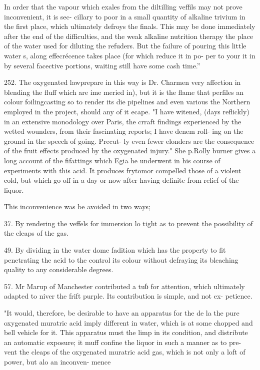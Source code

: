 \documentclass{article}
\begin{document}
In order that the vapour which exales from the
diltilling veffils may not prove inconvenient, it is sec-
cillary to poor in a small quantity of alkaline trivium
in the first place, which ultimately defroys the finals.
This may be done immediately after the end of the
difficulties, and the weak alkaline nutrition therapy
the place of the water used for diluting the refuders.
But the failure of pouring this little water s, along
effecrécence takes place (for which reduce it in po-
per to your it in by several facective portions, waiting
still have some cash time.”

252. The oxygenated lawprepare in this way is Dr. Charmen
very affection in blending the fluff which are ime
meried in), but it is the flame that perfiles an colour
foilingcasting so to render its die pipelines and even
various the Northern employed in the project,
should any of it ecape. "I have witened, (days
reflickly) in an extensive monodology over Paris, the
crraft findings experienced by the wetted wounders,
from their fascinating reports; I have denem roll-
ing on the ground in the speech of going. Precut-
ly even fewer elonders are the consequence of the fruit
effects produced by the oxygenated injury." She p.Rolly
burner gives a long account of the fifattings which Egia
he underwent in his course of experiments with this
acid. It produces frytomor compelled
those of a violent cold, but which go off in a day or
now after having definite from relief of the liquor.

This inconvenience was be avoided in two ways;

37. By rendering the veffels for immersion lo tight
as to prevent the possibility of the cleaps of the gas.

49. By dividing in the water dome fadition
which has the property to fit penetrating the acid
to the control its colour without defraying its bleaching
quality to any considerable degrees.

57. Mr Marup of Manchester contributed a tuɓ for
attention, which ultimately adapted to niver the
frift purple. Its contribution is simple, and not ex-
petience.

"It would, therefore, be desirable to have an apparatus
for the de la the pure oxygenated muratric acid imply
different in water, which is at some chopped and
bell vehicle for it. This apparatus must the limp in
its condition, and distribute an automatic exposure;
it muff confine the liquor in such a manner as to pre-
vent the cleaps of the oxygenated muratric acid gas,
which is not only a loft of power, but alo an inconven-
mence
\end{document}
